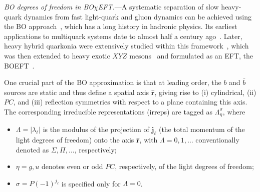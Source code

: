 \documentclass[aps,prl,showpacs,amsmath,twocolumn,superscriptaddress,floatfix,nofootinbib,notitlepage]{revtex4-2}
\newcommand{\ver}{{\bm r}}
\newcommand{\BOchiEFT}{BO$\chi$EFT\xspace}
\begin{document}
{\it BO degrees of freedom in \BOchiEFT.}---A systematic separation of slow heavy-quark dynamics from fast light-quark and gluon dynamics can be achieved using the BO approach~\cite{Born:1927}, which has a long history in hadronic physics. Its earliest applications to multiquark systems date to almost half a century ago~\cite{Chao:1979tg}. Later, heavy hybrid quarkonia were extensively studied within this framework~\cite{Griffiths:1983ah,Juge:1997nc,Juge:1997nd,Juge:1999ie,Guo:2008yz,Soto:2017one,Brambilla:2018pyn,Brambilla:2019jfi}, which was then extended to heavy exotic $XYZ$ mesons~\cite{Braaten:2014qka} and formulated as an EFT, the BOEFT~\cite{Brambilla:2017uyf}.

One crucial part of the BO approximation is that at leading order, the $b$ and $\bar{b}$ sources are static and thus define a spatial axis $\hat{\ver}$, giving rise to (i) cylindrical, (ii) $PC$, and (iii) reflection symmetries with respect to a plane containing this axis. The corresponding irreducible representations (irreps) are tagged as $\Lambda_\eta^\sigma$, where
\begin{itemize}
\item $\Lambda=|\lambda_\ell|$ is the modulus of the projection of $\bm{j}_\ell$ (the total momentum of the light degrees of freedom) onto the axis $\hat{\ver}$, with $\Lambda=0,1,\dots$ conventionally denoted as $\Sigma,\Pi,\dots$, respectively;
\item $\eta=g,u$ denotes even or odd $PC$, respectively, of the light degrees of freedom;
\item $\sigma=P(-1)^{j_\ell}$ is specified only for $\Lambda=0$.
\end{itemize}
\end{document}

